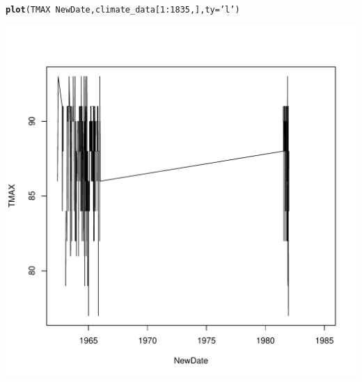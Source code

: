 \documentclass{article}\usepackage[]{graphicx}\usepackage[]{color}
\makeatletter
\def\maxwidth{ %
  \ifdim\Gin@nat@width>\linewidth
    \linewidth
  \else
    \Gin@nat@width
  \fi
}
\newcommand{\hlnum}[1]{\textcolor[rgb]{0.686,0.059,0.569}{#1}}%
\newcommand{\hlstr}[1]{\textcolor[rgb]{0.192,0.494,0.8}{#1}}%
\newcommand{\hlopt}[1]{\textcolor[rgb]{0,0,0}{#1}}%
\newcommand{\hlstd}[1]{\textcolor[rgb]{0.345,0.345,0.345}{#1}}%
\newcommand{\hlkwc}[1]{\textcolor[rgb]{0.333,0.667,0.333}{#1}}%
\newcommand{\hlkwd}[1]{\textcolor[rgb]{0.737,0.353,0.396}{\textbf{#1}}}%
\newenvironment{kframe}{%
 \def\at@end@of@kframe{}%
 \ifinner\ifhmode%
  \def\at@end@of@kframe{\end{minipage}}%
  \begin{minipage}{\columnwidth}%
 \fi\fi%
 \def\FrameCommand##1{\hskip\@totalleftmargin \hskip-\fboxsep
 \colorbox{shadecolor}{##1}\hskip-\fboxsep
     \hskip-\linewidth \hskip-\@totalleftmargin \hskip\columnwidth}%
 \MakeFramed {\advance\hsize-\width
   \@totalleftmargin\z@ \linewidth\hsize
   \@setminipage}}%
 {\par\unskip\endMakeFramed%
 \at@end@of@kframe}
\newenvironment{knitrout}{}{} %
\makeatother
\begin{document}
\begin{knitrout}
\color{fgcolor}\begin{kframe}
\begin{alltt}
\hlkwd{plot}\hlstd{(TMAX}\hlopt{~}\hlstd{NewDate, climate_data[}\hlnum{1}\hlopt{:}\hlnum{1835}\hlstd{,],} \hlkwc{ty}\hlstd{=}\hlstr{'l'}\hlstd{)}
\end{alltt}
\end{kframe}
\includegraphics[width=\maxwidth]{figure/unnamed-chunk-17-1} 

\end{knitrout}









\end{document}
